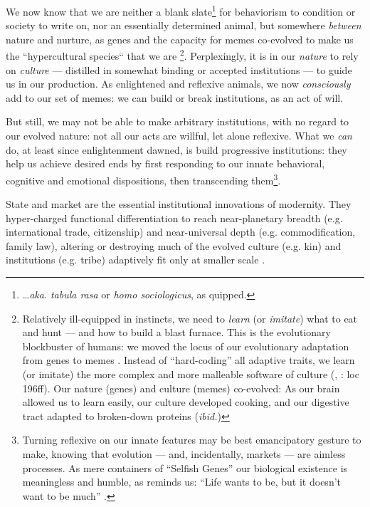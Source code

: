 \documentclass[11pt,a4paper,oneside,openright]{article}
\begin{document}
\begin{enumerate}
	We now know that we are neither a blank slate\footnote{
		\ldots \emph{aka.} \emph{tabula rasa} or \emph{homo sociologicus}, as \cite{Dahrendorf1965} quipped.} 
	for behaviorism to condition or society to write on, nor an essentially determined animal, but somewhere \emph{between} nature and nurture, as genes and the capacity for memes \citep{Dawkins1976} co-evolved to make us the ``hypercultural species`` that we are  \citep[loc 175]{Henrich2007}\footnote
		{Relatively ill-equipped in instincts, we need to \emph{learn} (or \emph{imitate}) what to eat and hunt --- and how to build a blast furnace. This is the evolutionary blockbuster of humans: we moved the locus of our evolutionary adaptation from genes to memes \citep{Dawkins1976}. Instead of ``hard-coding'' all adaptive traits, we learn (or imitate) the more complex and more malleable software of culture (\citealt{Boyd1985}, \citealt{Henrich2007}: loc 196ff). Our nature (genes) and culture (memes) co-evolved: As our brain allowed us to learn easily, our culture developed cooking, and our digestive tract adapted to broken-down proteins (\emph{ibid.})}. 
	Perplexingly, it is in our \emph{nature} to rely on \emph{culture}  --- distilled in somewhat binding or accepted institutions --- to guide us in our production. As enlightened and reflexive animals, we now \emph{consciously} add to our set of memes: 
	we can build or break institutions, as an act of will. 
	
	But still, we may not be able to make arbitrary institutions, with no regard to our evolved nature: not all our acts are willful, let alone reflexive. What we \emph{can} do, at least since enlightenment dawned, is build progressive institutions: they help us achieve desired ends by first responding to our innate behavioral, cognitive and emotional dispositions, then transcending them\footnote
		{Turning reflexive on our innate features may be best emancipatory gesture to make, knowing that evolution --- and, incidentally, markets --- are aimless processes. As mere containers of ``Selfish Genes'' \citep{Dawkins1976} our biological existence is meaningless and humble, as \citeauthor{Bryson2003} reminds us: ``Life wants to be, but it doesn't want to be much'' \citeyearpar{Bryson2003}.}.
	
	State and market are the essential institutional innovations of modernity. They hyper-charged functional differentiation to reach near-planetary breadth (e.g. international trade, citizenship) and near-universal depth (e.g. commodification, family law), altering or destroying much of the evolved culture (e.g. kin) and institutions (e.g. tribe) adaptively fit only at smaller scale \citep{Diamond1997}. 
	

\end{enumerate}
\end{document}
